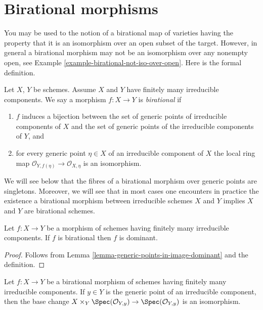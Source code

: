 \section{Birational morphisms}
\label{section-birational}

\noindent
You may be used to the notion of a birational map of varieties
having the property that it is an isomorphism over an open subset
of the target. However, in general a birational morphism may
not be an isomorphism over any nonempty open, see
Example \ref{example-birational-not-iso-over-open}.
Here is the formal definition.

\begin{definition}
\label{definition-birational}
\begin{reference}
\cite[(2.2.9)]{EGA1}
\end{reference}
Let $X$, $Y$ be schemes. Assume $X$ and $Y$ have finitely many
irreducible components. We say a morphism $f : X \to Y$ is
{\it birational} if
\begin{enumerate}
\item $f$ induces a bijection between the set of generic points
of irreducible components of $X$ and the set of generic points
of the irreducible components of $Y$, and
\item for every generic point $\eta \in X$ of an irreducible component
of $X$ the local ring map
$\mathcal{O}_{Y, f(\eta)} \to \mathcal{O}_{X, \eta}$
is an isomorphism.
\end{enumerate}
\end{definition}

\noindent
We will see below that the fibres of a birational morphism
over generic points are singletons. Moreover, we will see that
in most cases one encounters in practice the existence a birational morphism
between irreducible schemes $X$ and $Y$ implies
$X$ and $Y$ are birational schemes.

\begin{lemma}
\label{lemma-birational-dominant}
Let $f : X \to Y$ be a morphism of schemes having finitely
many irreducible components. If $f$ is birational then
$f$ is dominant.
\end{lemma}

\begin{proof}
Follows from Lemma \ref{lemma-generic-points-in-image-dominant}
and the definition.
\end{proof}

\begin{lemma}
\label{lemma-birational-generic-fibres}
Let $f : X \to Y$ be a birational morphism of schemes having finitely
many irreducible components. If $y \in Y$ is the generic point of
an irreducible component, then the base change
$X \times_Y \Spec(\mathcal{O}_{Y, y}) \to \Spec(\mathcal{O}_{Y, y})$
is an isomorphism.
\end{lemma}

